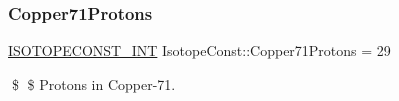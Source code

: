 \subsubsection{\texorpdfstring{Copper71\+Protons}{Copper71Protons}}
{\footnotesize\ttfamily \mbox{\hyperlink{group___isotope_const-_macros_ga5f18360b3e99483a35c32d789e62621c}{I\+S\+O\+T\+O\+P\+E\+C\+O\+N\+S\+T\+\_\+\+I\+NT}} Isotope\+Const\+::\+Copper71\+Protons = 29}

\$ \$ Protons in Copper-\/71. 
